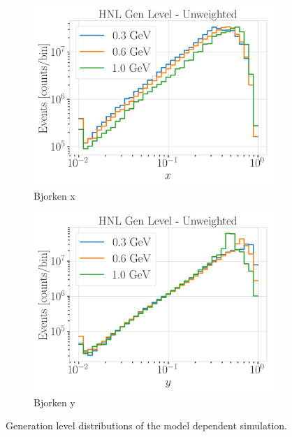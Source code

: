 \begin{figure}[h]
\begin{subfigure}{0.49\linewidth}
        \includegraphics{figures/hnl_simulation/generation/1_d_distr_finalStateX_gen_level_unweighted.png}
        \caption{Bjorken x}
    \end{subfigure}
    \begin{subfigure}{0.49\linewidth}
    \includegraphics{figures/hnl_simulation/generation/1_d_distr_finalStateY_gen_level_unweighted.png}
        \caption{Bjorken y}
    \end{subfigure}
    \caption[Model dependent simulation generation level distributions]{Generation level distributions of the model dependent simulation.}
\end{figure}


